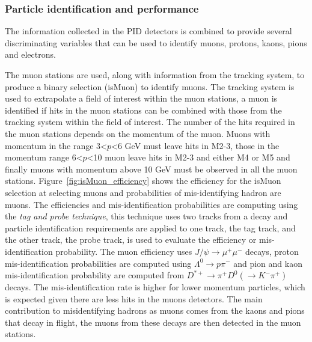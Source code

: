 \subsubsection{Particle identification and performance}
\label{PID_variables}

The information collected in the PID detectors is combined to provide several discriminating variables that can be used to identify muons, protons, kaons, pions and electrons.

The muon stations are used, along with information from the tracking system, to produce a binary selection (isMuon) to identify muons. The tracking system is used to extrapolate a field of interest within the muon stations, a muon is identified if hits in the muon stations can be combined with those from the tracking system within the field of interest. The number of the hits required in the muon stations depends on the momentum of the muon. Muons with momentum in the range 3<$p$<6 GeV must leave hits in M2-3, those in the momentum range 6<$p$<10 muon leave hits in M2-3 and either M4 or M5 and finally muons with momentum above 10 GeV must be observed in all the muon stations. Figure~\ref{fig:isMuon_efficiency} shows the efficiency for the isMuon selection at selecting muons and probabilities of mis-identifying hadron are muons. The efficiencies and mis-identification probabilities are computing using the {\it tag and probe technique}, this technique uses two tracks from a decay and particle identification requirements are applied to one track, the tag track, and the other track, the probe track, is used to evaluate the efficiency or mis-identification probability. The muon efficiency uses $J/\psi \to \mu^+ \mu^-$ decays, proton mis-identification probabilities are computed using $\Lambda^0 \to p \pi^-$ and pion and kaon mis-identification probability are computed from $D^{*+} \to \pi^+ D^0 (\to K^- \pi^+)$ decays. The mis-identification rate is higher for lower momentum particles, which is expected given there are less hits in the muons detectors. The main contribution to misidentifying hadrons as muons comes from the kaons and pions that decay in flight, the muons from these decays are then detected in the muon stations.


